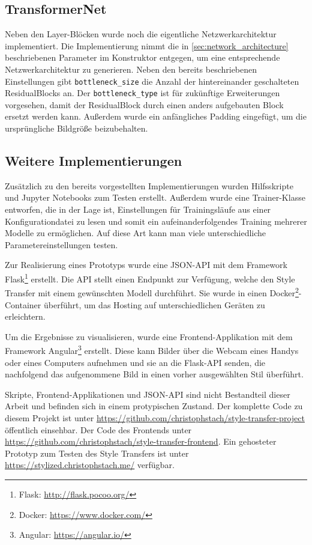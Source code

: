 \subsection{TransformerNet}

Neben den Layer-Blöcken wurde noch die eigentliche Netzwerkarchitektur implementiert. Die Implementierung nimmt die in \ref{sec:network_architecture} beschriebenen Parameter im Konstruktor entgegen, um eine entsprechende Netzwerkarchitektur zu generieren. Neben den bereits beschriebenen Einstellungen gibt \texttt{bottleneck_size} die Anzahl der hintereinander geschalteten ResidualBlocks an. Der \texttt{bottleneck_type} ist für zukünftige Erweiterungen vorgesehen, damit der ResidualBlock durch einen anders aufgebauten Block ersetzt werden kann. Außerdem wurde ein anfängliches Padding eingefügt, um die ursprüngliche Bildgröße beizubehalten.

\subsection{Weitere Implementierungen}

Zusätzlich zu den bereits vorgestellten Implementierungen wurden Hilfsskripte und Jupyter Notebooks zum Testen erstellt. Außerdem wurde eine Trainer-Klasse entworfen, die in der Lage ist, Einstellungen für Trainingsläufe aus einer Konfigurationdatei zu lesen und somit 
ein aufeinanderfolgendes Training mehrerer Modelle zu ermöglichen. Auf diese Art kann man viele unterschiedliche Parametereinstellungen testen.

Zur Realisierung eines Prototyps wurde eine JSON-API mit dem Framework Flask\footnote{Flask: \url{http://flask.pocoo.org/}} erstellt. Die API stellt einen Endpunkt zur Verfügung, welche den Style Transfer mit einem gewünschten Modell durchführt. Sie wurde in einen Docker\footnote{Docker: \url{https://www.docker.com/}}-Container überführt, um das Hosting auf unterschiedlichen Geräten zu erleichtern.

Um die Ergebnisse zu visualisieren, wurde eine Frontend-Applikation mit dem Framework Angular\footnote{Angular: \url{https://angular.io/}} erstellt. Diese kann Bilder über die Webcam eines Handys oder eines Computers aufnehmen und sie an die Flask-API senden, die nachfolgend das aufgenommene Bild in einen vorher ausgewählten Stil überführt.

Skripte, Frontend-Applikationen und JSON-API sind nicht Bestandteil dieser Arbeit und befinden sich in einem protypischen Zustand. Der komplette Code zu diesem Projekt ist unter \url{https://github.com/christophstach/style-transfer-project} öffentlich einsehbar. Der Code des Frontends unter \url{https://github.com/christophstach/style-transfer-frontend}. Ein gehosteter Prototyp zum Testen des Style Transfers ist unter \url{https://stylized.christophstach.me/} verfügbar.